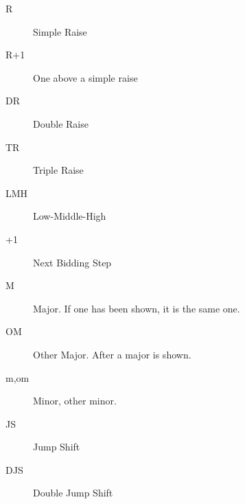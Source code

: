 \documentclass[tom-ari]{subfile}
\begin{document}
\begin{description}
	\item[R] Simple Raise
	\item[R+1] One above a simple raise
	\item[DR] Double Raise
	\item[TR] Triple Raise
	\item[LMH] Low-Middle-High
	\item[+1] Next Bidding Step
	\item[M] Major.  If one has been shown, it is the same one.
	\item[OM] Other Major.  After a major is shown.
	\item[m,om] Minor, other minor.
	\item[JS] Jump Shift
	\item[DJS] Double Jump Shift
\end{description}
\end{document}
